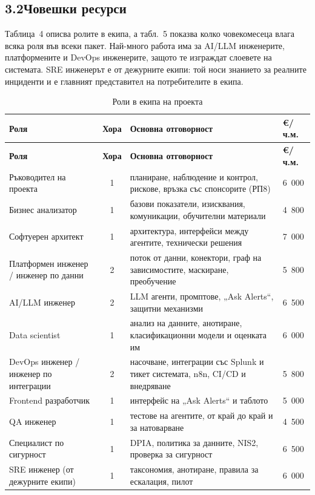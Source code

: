 \documentclass[11pt,a4paper]{article}
\begin{document}
\subsection*{3.2\quad Човешки ресурси}
Таблица~4 описва ролите в екипа, а табл.~5 показва колко човекомесеца влага всяка роля във всеки пакет. Най-много работа има за AI/LLM инженерите, платформените и DevOps инженерите, защото те изграждат слоевете на системата. SRE инженерът е от дежурните екипи: той носи знанието за реалните инциденти и е главният представител на потребителите в екипа.
{\small
\begin{xltabular}{\textwidth}{@{}L{3.6cm} c X R{1.6cm}@{}}
\caption{Роли в екипа на проекта}\label{tab:team}\\
\toprule
\textbf{Роля} & \textbf{Хора} & \textbf{Основна отговорност} & \textbf{\euro{}/ч.м.}\\
\midrule
\endfirsthead
\toprule
\textbf{Роля} & \textbf{Хора} & \textbf{Основна отговорност} & \textbf{\euro{}/ч.м.}\\
\midrule
\endhead
\bottomrule
\endlastfoot
Ръководител на проекта & 1 & планиране, наблюдение и контрол, рискове, връзка със спонсорите (РП8) & 6~000\\
Бизнес анализатор & 1 & базови показатели, изисквания, комуникации, обучителни материали & 4~800\\
Софтуерен архитект & 1 & архитектура, интерфейси между агентите, технически решения & 7~000\\
Платформен инженер / инженер по данни & 2 & поток от данни, конектори, граф на зависимостите, маскиране, преобучение & 5~800\\
AI/LLM инженер & 2 & LLM агенти, промптове, „Ask Alerts“, защитни механизми & 6~500\\
Data scientist & 1 & анализ на данните, анотиране, класификационни модели и оценката им & 6~000\\
DevOps инженер / инженер по интеграции & 2 & насочване, интеграции със Splunk и тикет системата, n8n, CI/CD и внедряване & 5~800\\
Frontend разработчик & 1 & интерфейс на „Ask Alerts“ и таблото & 5~000\\
QA инженер & 1 & тестове на агентите, от край до край и за натоварване & 4~500\\
Специалист по сигурност & 1 & DPIA, политика за данните, NIS2, проверка за сигурност & 6~500\\
SRE инженер (от дежурните екипи) & 1 & таксономия, анотиране, правила за ескалация, пилот & 6~000\\
\end{xltabular}}
\end{document}
